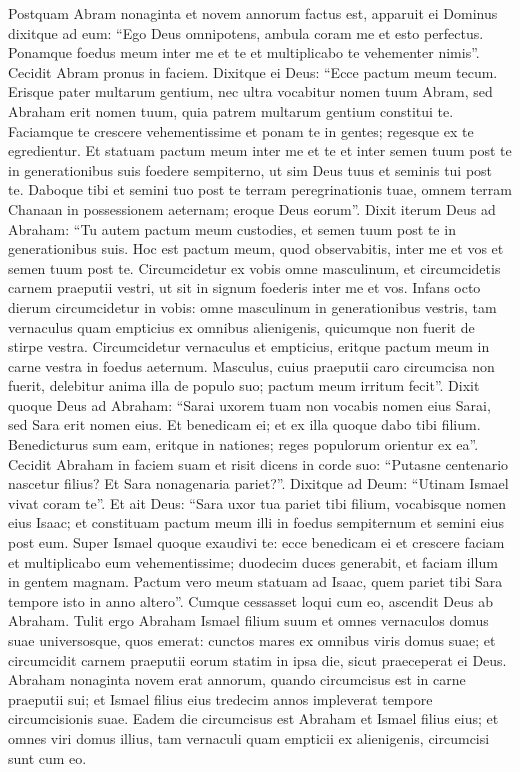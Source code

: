 \begin{biblechapter}  
\verse Postquam Abram nonaginta et novem annorum factus est, apparuit ei Dominus dixitque ad eum: “Ego Deus omnipotens, ambula coram me et esto perfectus. 
\verse Ponamque foedus meum inter me et te et multiplicabo te vehementer nimis”. 
\verse Cecidit Abram pronus in faciem. 
\verse Dixitque ei Deus: “Ecce pactum meum tecum. Erisque pater multarum gentium, 
\verse nec ultra vocabitur nomen tuum Abram, sed Abraham erit nomen tuum, quia patrem multarum gentium constitui te. 
\verse Faciamque te crescere vehementissime et ponam te in gentes; regesque ex te egredientur. 
\verse Et statuam pactum meum inter me et te et inter semen tuum post te in generationibus suis foedere sempiterno, ut sim Deus tuus et seminis tui post te. 
\verse Daboque tibi et semini tuo post te terram peregrinationis tuae, omnem terram Chanaan in possessionem aeternam; eroque Deus eorum”. 
\verse Dixit iterum Deus ad Abraham: “Tu autem pactum meum custodies, et semen tuum post te in generationibus suis. 
\verse Hoc est pactum meum, quod observabitis, inter me et vos et semen tuum post te. Circumcidetur ex vobis omne masculinum,  
\verse et circumcidetis carnem praeputii vestri, ut sit in signum foederis inter me et vos. 
\verse Infans octo dierum circumcidetur in vobis: omne masculinum in generationibus vestris, tam vernaculus quam empticius ex omnibus alienigenis, quicumque non fuerit de stirpe vestra. 
\verse Circumcidetur vernaculus et empticius, eritque pactum meum in carne vestra in foedus aeternum. 
\verse Masculus, cuius praeputii caro circumcisa non fuerit, delebitur anima illa de populo suo; pactum meum irritum fecit”. 
\verse Dixit quoque Deus ad Abraham: “Sarai uxorem tuam non vocabis nomen eius Sarai, sed Sara erit nomen eius. 
\verse Et benedicam ei; et ex illa quoque dabo tibi filium. Benedicturus sum eam, eritque in nationes; reges populorum orientur ex ea”. 
\verse Cecidit Abraham in faciem suam et risit dicens in corde suo: “Putasne centenario nascetur filius? Et Sara nonagenaria pariet?”. 
\verse Dixitque ad Deum: “Utinam Ismael vivat coram te”. 
\verse Et ait Deus: “Sara uxor tua pariet tibi filium, vocabisque nomen eius Isaac; et constituam pactum meum illi in foedus sempiternum et semini eius post eum. 
\verse Super Ismael quoque exaudivi te: ecce benedicam ei et crescere faciam et multiplicabo eum vehementissime; duodecim duces generabit, et faciam illum in gentem magnam.  
\verse Pactum vero meum statuam ad Isaac, quem pariet tibi Sara tempore isto in anno altero”. 
\verse Cumque cessasset loqui cum eo, ascendit Deus ab Abraham. 
\verse Tulit ergo Abraham Ismael filium suum et omnes vernaculos domus suae universosque, quos emerat: cunctos mares ex omnibus viris domus suae; et circumcidit carnem praeputii eorum statim in ipsa die, sicut praeceperat ei Deus. 
\verse Abraham nonaginta novem erat annorum, quando circumcisus est in carne praeputii sui; 
\verse et Ismael filius eius tredecim annos impleverat tempore circumcisionis suae. 
\verse Eadem die circumcisus est Abraham et Ismael filius eius; 
\verse et omnes viri domus illius, tam vernaculi quam empticii ex alienigenis, circumcisi sunt cum eo. 
\end{biblechapter}

